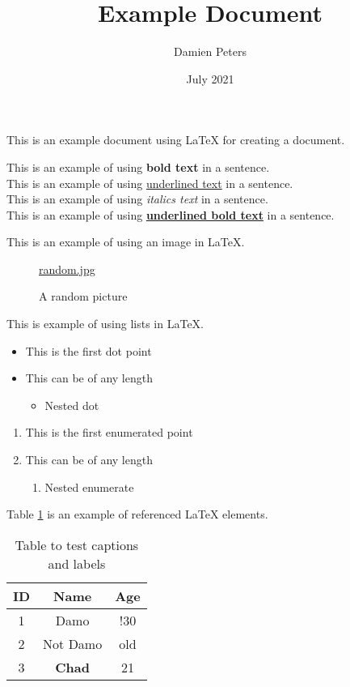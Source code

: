 \documentclass[12pt, letterpaper]{article}
\title{Example Document}
\author{Damien Peters}
\date{July 2021}
\begin{document}
\maketitle

This is an example document using \LaTeX{} for creating a document.



This is an example of using \textbf{bold text} in a sentence.\\
This is an example of using \underline{underlined text} in a sentence.\\
This is an example of using \textit{italics text} in a sentence.\\
This is an example of using \textbf{\underline{underlined bold text}} in a sentence.
\par


This is an example of using an image in \LaTeX{}.

\begin{figure}[h]
	\centering
	\href{wget https://hatrabbits.com/wp-content/uploads/2017/01/random.jpg}{random.jpg}
	\caption{A random picture}
	\label{fig:random1}
\end{figure}
\par
\newpage

This is example of using lists in \LaTeX{}.

\begin{itemize}
	\item This is the first dot point
	\item This can be of any length
	\begin{itemize}
		\item Nested dot
	\end{itemize}
\end{itemize}

\begin{enumerate}
	\item This is the first enumerated point
	\item This can be of any length
	\begin{enumerate}
		\item Nested enumerate
	\end{enumerate}
\end{enumerate}
\par

Table \ref{table:data} is an example of referenced \LaTeX{} elements.

\begin{table}[h!]
\centering
\begin{tabular}{||c c c||} 
 \hline
 ID & Name & Age \\ [0.5ex] 
 \hline\hline
 1 & Damo & !30 \\ 
 2 & Not Damo & old  \\
 3 & \textbf{Chad} & 21 \\ [1ex] 
 \hline
\end{tabular}
\caption{Table to test captions and labels}
\label{table:data}
\end{table}
\end{document}
